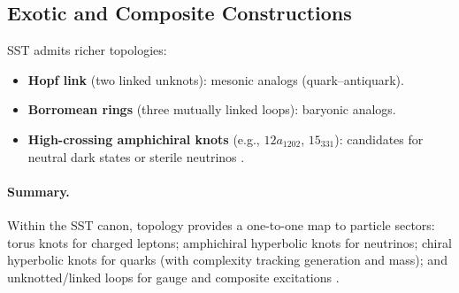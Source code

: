 \documentclass[11pt]{article}
\begin{document}
\subsection{Exotic and Composite Constructions}

SST admits richer topologies:
\begin{itemize}
\item \textbf{Hopf link} (two linked unknots): mesonic analogs (quark–antiquark).
\item \textbf{Borromean rings} (three mutually linked loops): baryonic analogs.
\item \textbf{High-crossing amphichiral knots} (e.g., $12a_{1202}$, $15_{331}$): candidates for neutral dark states or sterile neutrinos \cite{KnotAtlas}.
\end{itemize}

\paragraph{Summary.}
    Within the SST canon, topology provides a one-to-one map to particle sectors: torus knots for charged leptons; amphichiral hyperbolic knots for neutrinos; chiral hyperbolic knots for quarks (with complexity tracking generation and mass); and unknotted/linked loops for gauge and composite excitations \cite{Iskandarani2025Canon,Iskandarani2025Helicity,Iskandarani2025Mass}.
\end{document}
